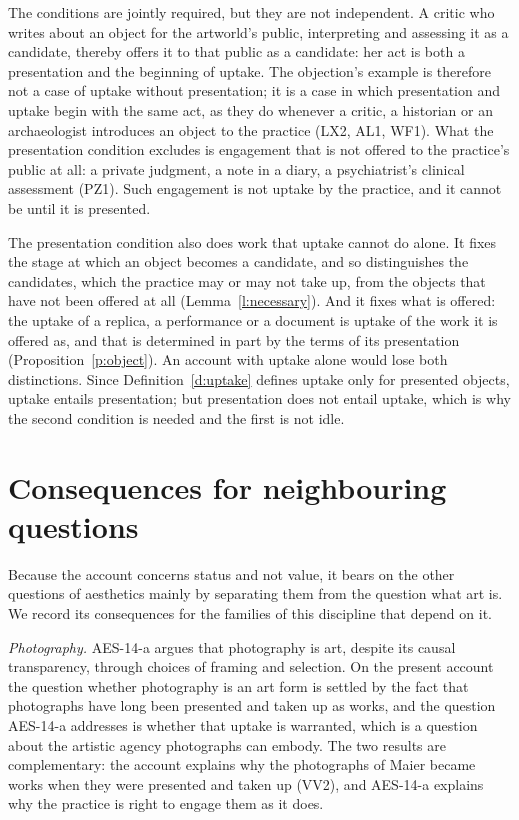 \documentclass{situationist-preprint}
\begin{document}
\begin{reply}
The conditions are jointly required, but they are not independent. A critic who writes about an object for the artworld's public, interpreting and assessing it as a candidate, thereby offers it to that public as a candidate: her act is both a presentation and the beginning of uptake. The objection's example is therefore not a case of uptake without presentation; it is a case in which presentation and uptake begin with the same act, as they do whenever a critic, a historian or an archaeologist introduces an object to the practice (LX2, AL1, WF1). What the presentation condition excludes is engagement that is not offered to the practice's public at all: a private judgment, a note in a diary, a psychiatrist's clinical assessment (PZ1). Such engagement is not uptake by the practice, and it cannot be until it is presented.

The presentation condition also does work that uptake cannot do alone. It fixes the stage at which an object becomes a candidate, and so distinguishes the candidates, which the practice may or may not take up, from the objects that have not been offered at all (Lemma~\ref{l:necessary}). And it fixes what is offered: the uptake of a replica, a performance or a document is uptake of the work it is offered as, and that is determined in part by the terms of its presentation (Proposition~\ref{p:object}). An account with uptake alone would lose both distinctions. Since Definition~\ref{d:uptake} defines uptake only for presented objects, uptake entails presentation; but presentation does not entail uptake, which is why the second condition is needed and the first is not idle.
\end{reply}

\section{Consequences for neighbouring questions}\label{s:consequences}

Because the account concerns status and not value, it bears on the other questions of aesthetics mainly by separating them from the question what art is. We record its consequences for the families of this discipline that depend on it.

\emph{Photography.} AES-14-a argues that photography is art, despite its causal transparency, through choices of framing and selection. On the present account the question whether photography is an art form is settled by the fact that photographs have long been presented and taken up as works, and the question AES-14-a addresses is whether that uptake is warranted, which is a question about the artistic agency photographs can embody. The two results are complementary: the account explains why the photographs of Maier became works when they were presented and taken up (VV2), and AES-14-a explains why the practice is right to engage them as it does.
\end{document}
